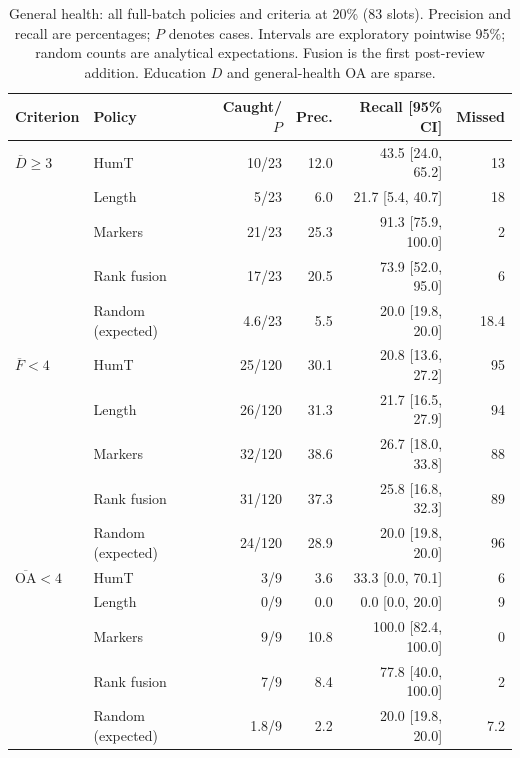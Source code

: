 \begin{table}[t]
\centering\small
\caption{General health: all full-batch policies and criteria at 20\% (83 slots). Precision and recall are percentages; $P$ denotes cases. Intervals are exploratory pointwise 95\%; random counts are analytical expectations. Fusion is the first post-review addition. Education $D$ and general-health OA are sparse.}
\label{tab:full_health}
\begin{tabular}{llrrrr}
\toprule
Criterion & Policy & Caught/$P$ & Prec. & Recall [95\% CI] & Missed \\
\midrule
$\overline D\geq3$ & HumT & 10/23 & 12.0 & 43.5 [24.0, 65.2] & 13 \\
 & Length & 5/23 & 6.0 & 21.7 [5.4, 40.7] & 18 \\
 & Markers & 21/23 & 25.3 & 91.3 [75.9, 100.0] & 2 \\
 & Rank fusion & 17/23 & 20.5 & 73.9 [52.0, 95.0] & 6 \\
 & Random (expected) & 4.6/23 & 5.5 & 20.0 [19.8, 20.0] & 18.4 \\
$\overline F<4$ & HumT & 25/120 & 30.1 & 20.8 [13.6, 27.2] & 95 \\
 & Length & 26/120 & 31.3 & 21.7 [16.5, 27.9] & 94 \\
 & Markers & 32/120 & 38.6 & 26.7 [18.0, 33.8] & 88 \\
 & Rank fusion & 31/120 & 37.3 & 25.8 [16.8, 32.3] & 89 \\
 & Random (expected) & 24/120 & 28.9 & 20.0 [19.8, 20.0] & 96 \\
$\overline{\mathrm{OA}}<4$ & HumT & 3/9 & 3.6 & 33.3 [0.0, 70.1] & 6 \\
 & Length & 0/9 & 0.0 & 0.0 [0.0, 20.0] & 9 \\
 & Markers & 9/9 & 10.8 & 100.0 [82.4, 100.0] & 0 \\
 & Rank fusion & 7/9 & 8.4 & 77.8 [40.0, 100.0] & 2 \\
 & Random (expected) & 1.8/9 & 2.2 & 20.0 [19.8, 20.0] & 7.2 \\
\bottomrule
\end{tabular}
\end{table}
